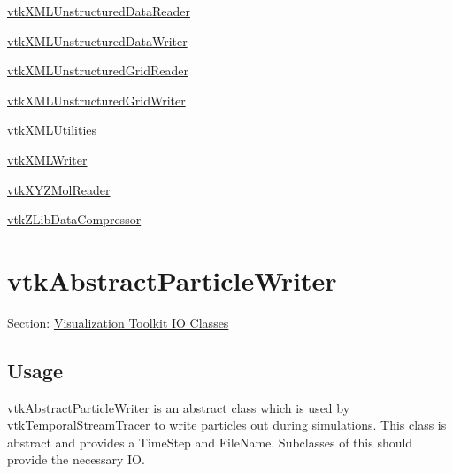 \begin{DoxyItemize}
\item \hyperlink{vtkio_vtkxmlunstructureddatareader}{vtk\-X\-M\-L\-Unstructured\-Data\-Reader}  
\item \hyperlink{vtkio_vtkxmlunstructureddatawriter}{vtk\-X\-M\-L\-Unstructured\-Data\-Writer}  
\item \hyperlink{vtkio_vtkxmlunstructuredgridreader}{vtk\-X\-M\-L\-Unstructured\-Grid\-Reader}  
\item \hyperlink{vtkio_vtkxmlunstructuredgridwriter}{vtk\-X\-M\-L\-Unstructured\-Grid\-Writer}  
\item \hyperlink{vtkio_vtkxmlutilities}{vtk\-X\-M\-L\-Utilities}  
\item \hyperlink{vtkio_vtkxmlwriter}{vtk\-X\-M\-L\-Writer}  
\item \hyperlink{vtkio_vtkxyzmolreader}{vtk\-X\-Y\-Z\-Mol\-Reader}  
\item \hyperlink{vtkio_vtkzlibdatacompressor}{vtk\-Z\-Lib\-Data\-Compressor}  
\end{DoxyItemize}\hypertarget{vtkio_vtkabstractparticlewriter}{}\section{vtk\-Abstract\-Particle\-Writer}\label{vtkio_vtkabstractparticlewriter}
Section\-: \hyperlink{sec_vtkio}{Visualization Toolkit I\-O Classes} \hypertarget{vtkwidgets_vtkxyplotwidget_Usage}{}\subsection{Usage}\label{vtkwidgets_vtkxyplotwidget_Usage}
vtk\-Abstract\-Particle\-Writer is an abstract class which is used by vtk\-Temporal\-Stream\-Tracer to write particles out during simulations. This class is abstract and provides a Time\-Step and File\-Name. Subclasses of this should provide the necessary I\-O.

